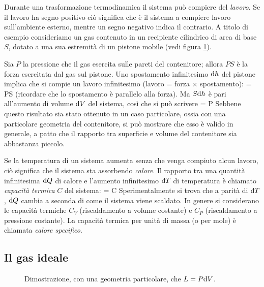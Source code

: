 Durante una trasformazione termodinamica il sistema può compiere del {\em lavoro}. Se il lavoro ha segno positivo ciò significa che è il sistema a compiere lavoro sull'ambiente esterno, mentre un segno negativo indica il contrario. A titolo di esempio consideriamo un gas contenuto in un recipiente cilindrico di area di base $S$, dotato a una sua estremità di un pistone mobile (vedi figura \ref{fig:01-pistone}). 

Sia $P$ la pressione che il gas esercita sulle pareti del contenitore; allora $PS$ è la forza esercitata dal gas sul pistone. Uno spostamento infinitesimo ${\textrm d}h$ del pistone implica che si compie un lavoro infinitesimo (lavoro = forza $\times$ spostamento):
\be
\label{eq:01-lavoro_1}
 = PS
\ee
(ricordare che lo spostamento è parallelo alla forza). Ma $S{\textrm d}h$ è pari all'aumento di volume ${\textrm d}V$ del sistema, così che si può scrivere
\be
\label{eq:01-lavoro_2}
 = P
\ee
Sebbene questo risultato sia stato ottenuto in un caso particolare, ossia con una particolare geometria del contenitore, si può mostrare che esso è valido in generale, a patto che il rapporto tra superficie e volume del contenitore sia abbastanza piccolo.

Se la temperatura di un sistema aumenta senza che venga compiuto alcun lavoro, ciò significa che il sistema sta assorbendo {\em calore}. Il rapporto tra una quantità infinitesima ${\textrm d}Q$ di calore e l'aumento infinitesimo ${\textrm d}T$ di temperatura è chiamato {\em capacità termica} $C$ del sistema:
\be
\label{eq:01-cap_termica}
 = C
\ee
Sperimentalmente si trova che a parità di ${\textrm d}T$, ${\textrm d}Q$ cambia a seconda di come il sistema viene scaldato. In genere si considerano le capacità termiche $C_{V}$ (riscaldamento a volume costante) e $C_{P}$ (riscaldamento a pressione costante). La capacità termica per unità di massa (o per mole) è chiamata {\em calore specifico}.

\subsection{Il gas ideale}

\begin{figure}[!ht]
  \centering
  
  \caption{Dimostrazione, con una geometria particolare, che $L=P{\textrm d}V$.}
  \label{fig:01-pistone}
\end{figure}

